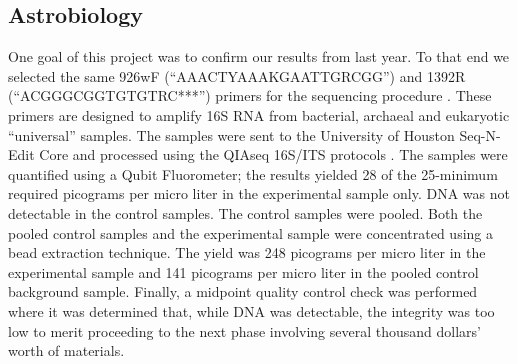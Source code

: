 \subsection{Astrobiology}
\label{sec:Astrobiology-Results}

One goal of this project was to confirm our results from last year. To that end we selected the same 926wF (“AAACTYAAAKGAATTGRCGG”) and 1392R (“ACGGGCGGTGTGTRC***”) primers for the sequencing procedure \cite{SORA}. These primers are designed to amplify 16S RNA from bacterial, archaeal and eukaryotic “universal” samples. The samples were sent to the University of Houston Seq-N-Edit Core and processed using the QIAseq 16S/ITS protocols \cite{QIAseq}. The samples were quantified using a Qubit Fluorometer; the results yielded 28 of the 25-minimum required picograms per micro liter in the experimental sample only. DNA was not detectable in the control samples. The control samples were pooled. Both the pooled control samples and the experimental sample were concentrated using a bead extraction technique. The yield was 248 picograms per micro liter in the experimental sample and 141 picograms per micro liter in the pooled control background sample. Finally, a midpoint quality control check was  performed where it was determined that, while DNA was detectable, the integrity was too low to merit proceeding to the next phase involving several thousand dollars’ worth of materials. 